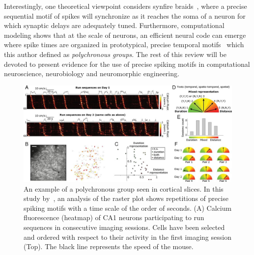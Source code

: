\documentclass[brainsci, %
               review,submit,pdftex,moreauthors
               ]{Definitions/mdpi}
\begin{document}
Interestingly, one theoretical viewpoint considers synfire braids~\citep{bienenstock_model_1995}, where a precise sequential motif of spikes will synchronize as it reaches the soma of a neuron for which synaptic delays are adequately tuned. Furthermore, computational modeling shows that at the scale of neurons, an efficient neural code can emerge where spike times are organized in prototypical, precise temporal motifs~\citep{izhikevich_polychronization_2006} which this author defined as \emph{polychronous groups}. The rest of this review will be devoted to present evidence for the use of precise spiking motifs in computational neuroscience, neurobiology and neuromorphic engineering.
%
\begin{figure}
\centering
\includegraphics[width=\linewidth]{figures/haimerl2019.jpg}
\caption{An example of a polychronous group seen in cortical slices. In this study by~\citep{haimerl_internal_2019}, an analysis of the raster plot shows repetitions of precise spiking motifs with a time scale of the order of seconds. (A) Calcium fluorescence (heatmap) of CA1 neurons participating to run sequences in consecutive imaging sessions. Cells have been selected and ordered with respect to their activity in the first imaging session (Top). The black line represents the speed of the mouse.}\label{fig:haimerl}
\end{figure}
%
\end{document}

